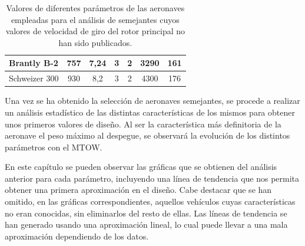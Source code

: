 \begin{table}[htbp]
\begin{tabular}{|l|c|c|c|c|c|c|}
		\hline
		\rowcolor[rgb]{ .949,  .949,  .949} Brantly B-2 & \cellcolor[rgb]{ 1,  1,  1}757 & \cellcolor[rgb]{ 1,  1,  1}7,24 & \cellcolor[rgb]{ 1,  1,  1}3 & \cellcolor[rgb]{ 1,  1,  1}2 & \cellcolor[rgb]{ 1,  1,  1}3290 & \cellcolor[rgb]{ 1,  1,  1}161 \\
		\hline
		\rowcolor[rgb]{ .949,  .949,  .949} Schweizer 300 & \cellcolor[rgb]{ 1,  1,  1}930 & \cellcolor[rgb]{ 1,  1,  1}8,2 & \cellcolor[rgb]{ 1,  1,  1}3 & \cellcolor[rgb]{ 1,  1,  1}2 & \cellcolor[rgb]{ 1,  1,  1}4300 & \cellcolor[rgb]{ 1,  1,  1}176 \\
		\hline
	\end{tabular}%
	\caption{Valores de diferentes parámetros de las aeronaves empleadas para el análisis de semejantes cuyos valores de velocidad de giro del rotor principal no han sido publicados.}
	\label{AS}
\end{table}%



Una vez se ha obtenido la selección de aeronaves semejantes, se procede a realizar un análisis estadístico de las distintas características de los mismos para obtener unos primeros valores de diseño. Al ser la característica más definitoria de la aeronave el peso máximo al despegue, se observará la evolución de los distintos parámetros con el MTOW.

En este capítulo se pueden observar las gráficas que se obtienen del análisis anterior para cada parámetro, incluyendo una línea de tendencia que nos permita obtener una primera aproximación en el diseño. Cabe destacar que se han omitido, en las gráficas correspondientes, aquellos vehículos cuyas características no eran conocidas, sin eliminarlos del resto de ellas. Las líneas de tendencia se han generado usando una aproximación lineal, lo cual puede llevar a una mala aproximación dependiendo de los datos.


